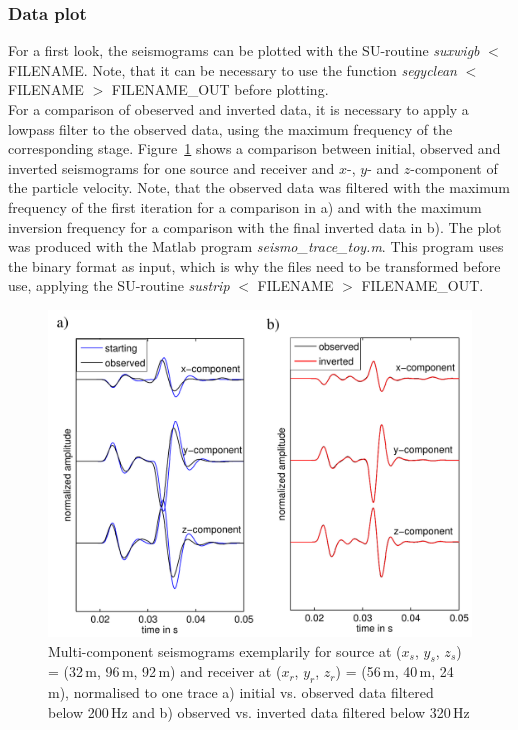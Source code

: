 \subsubsection*{Data plot}
For a first look, the seismograms can be plotted with the SU-routine \textit{suxwigb} $<$ FILENAME. Note, that it can be necessary to use the function \textit{segyclean} $<$ FILENAME $>$ FILENAME\_OUT before plotting.\\
For a comparison of obeserved and inverted data, it is necessary to apply a lowpass filter to the observed data, using the maximum frequency of the corresponding stage. Figure~\ref{fig:toy_seismo1} shows a comparison between initial, observed and inverted seismograms for one source and receiver and $x$-, $y$- and $z$-component of the particle velocity. Note, that the observed data was filtered with the maximum frequency of the first iteration for a comparison in a) and with the maximum inversion frequency for a comparison with the final inverted data in b). The plot was produced with the Matlab program \textit{seismo\_trace\_toy.m}. This program uses the binary format as input, which is why the files need to be transformed before use, applying the SU-routine \textit{sustrip} $<$ FILENAME $>$ FILENAME\_OUT.
\begin{figure}[h!]
\begin{center}
\includegraphics[width=\textwidth]{fig_toy/seismo1_toy}
\caption[Toy example - observed, initial and inverted seismograms]{Multi-component seismograms exemplarily for source at ($x_s$, $y_s$, $z_s$) = (32\,m, 96\,m, 92\,m) and receiver at ($x_r$, $y_r$, $z_r$) = (56\,m, 40\,m, 24\,m), normalised to one trace a) initial vs. observed data filtered below 200\,Hz and b) observed vs. inverted data filtered below 320\,Hz} \label{fig:toy_seismo1}
\end{center}
\end{figure}
